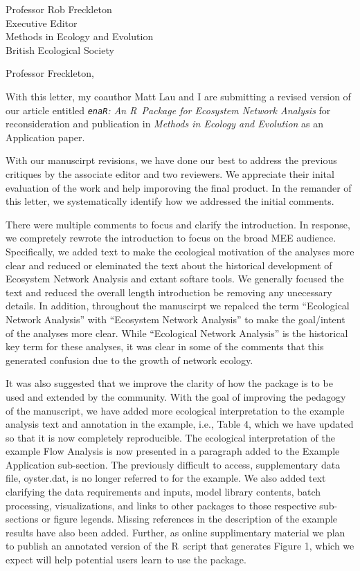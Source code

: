 \documentclass[letter]{letter}
\newcommand{\R}{R}
\begin{document}
\begin{letter}{Professor Rob Freckleton\\
Executive Editor\\
Methods in Ecology and Evolution\\
British Ecological Society
}

\opening{Professor Freckleton, }

With this letter, my coauthor Matt Lau and I are submitting a revised
version of our article entitled \emph{\texttt{enaR}: An \R\ Package
for Ecosystem Network Analysis} for reconsideration and publication in
\emph{Methods in Ecology and Evolution} as an Application paper.  

With our manuscirpt revisions, we have done our best to address the previous
critiques by the associate editor and two reviewers.  We appreciate
their inital evaluation of the work and help imporoving the final
product.  In the remander of this letter, we systematically identify
how we addressed the initial comments.

There were multiple comments to focus and clarify the introduction. In
response, we compretely rewrote the introduction to focus on the broad
MEE audience.  Specifically, we added text to make the ecological
motivation of the analyses more clear and reduced or eleminated the
text about the historical development of Ecosystem Network Analysis
and extant softare tools. We generally focused the text and reduced
the overall length introduction be removing any unecessary details.
In addition, throughout the manuscirpt we repalced the term
``Ecological Network Analysis'' with ``Ecosystem Network Analysis'' to
make the goal/intent of the analyses more clear.  While ``Ecological
Network Analysis'' is the historical key term for these analyses, it
was clear in some of the comments that this generated confusion due to
the growth of network ecology.

It was also suggested that we improve the clarity of how the package
is to be used and extended by the community. With the goal of
improving the pedagogy of the manuscript, we have added more
ecological interpretation to the example analysis text and annotation
in the example, i.e., Table 4, which we have updated so that it is now
completely reproducible. The ecological interpretation of the example
Flow Analysis is now presented in a paragraph added to the Example
Application sub-section. The previously difficult to access,
supplementary data file, oyster.dat, is no longer referred to for the
example. We also added text clarifying the data requirements and
inputs, model library contents, batch processing, visualizations, and
links to other packages to those respective sub-sections or figure
legends. Missing references in the description of the example results
have also been added.  Further, as online supplimentary material we
plan to publish an annotated version of the \R\ script that generates
Figure 1, which we expect will help potential users learn to use the
package.


\end{letter}
\end{document}
